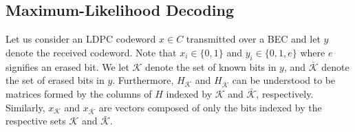 \documentclass[10pt,twocolumn,twoside]{IEEEtran} \newlength{\pic}
\theoremstyle{definition}
\theoremstyle{remark}
\theoremstyle{plain}
\begin{document}
\subsection{Maximum-Likelihood Decoding}\label{subsec:ML}
Let us consider an LDPC codeword $x\in C$ transmitted over a BEC and let $y$ denote the received codeword. Note that $x_i\in\{0,1\}$ and $y_i\in\{0,1,e\}$ where $e$ signifies an erased bit. We let $\mathcal{K}$ denote the set of known bits in $y$, and $\bar{\mathcal{K}}$ denote the set of erased bits in $y$. Furthermore, $H_{\mathcal{K}}$ and $H_{\bar{\mathcal{K}}}$ can be understood to be matrices formed by the columns of $H$ indexed by $\mathcal{K}$ and $\bar{\mathcal{K}}$, respectively. Similarly, $x_{\mathcal{K}}$ and $x_{\bar{\mathcal{K}}}$ are vectors composed of only the bits indexed by the respective sets $\mathcal{K}$ and $\bar{\mathcal{K}}$.
\end{document}

